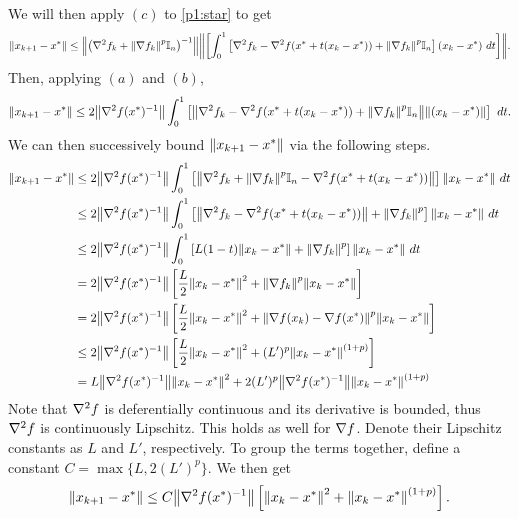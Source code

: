 \begin{solution}
    \newpage
    We will then apply $(c)$ to \ref{p1:star} to get 
    \[\norm{x_{k+1} - x^{*}} \leq \norm{\left ( \nabla^2f_k + \norm{\nabla f_k}^p \mathbb{I}_n\right)^{-1}}\norm{\left[ \int_0^1 \left[ \nabla^2 f_k - \nabla^2f(x^{*} + t(x_k - x^{*})) + \norm{\nabla f_k}^p\mathbb{I}_n\right](x_k - x^{*}) \ dt\right]}.\]
    Then, applying $(a)$ and $(b)$, 
    \[\norm{x_{k+1} - x^{*}} \leq 2\norm{\nabla^2f(x^{*})^{-1}} \int_0^1 \left[ \norm{\nabla^2 f_k - \nabla^2f(x^{*} + t(x_k - x^{*})) + \norm{\nabla f_k}^p\mathbb{I}_n}\norm{(x_k - x^{*})} \right] \ dt.\]
    We can then successively bound $\norm{x_{k+1} - x^{*}}$ via the following steps.
    \begin{align*}
        \norm{x_{k+1} - x\star} &\leq 2\norm{\grad^2f(x\star)\inv}\int_0^1 \left[ \norm{\grad^2f_k + \norm{\grad f_k}^p\id_n - \grad^2 f(x\star + t(x_k - x\star))}\right]\norm{x_k - x\star} \ dt \\
        &\leq 2\norm{\grad^2f(x\star)\inv}\int_0^1 \left[ \norm{\grad^2f_k - \grad^2 f(x\star + t(x_k - x\star))}  + \norm{\grad f_k}^p\right]\norm{x_k - x\star} \ dt \\
        &\leq 2\norm{\grad^2f(x\star)\inv}\int_0^1 \left[ L(1 - t)\norm{x_k - x\star}  + \norm{\grad f_k}^p\right]\norm{x_k - x\star} \ dt \\
        &= 2\norm{\grad^2f(x\star)\inv}\left[ \frac{L}{2}\norm{x_k - x\star}^2  + \norm{\grad f_k}^p\norm{x_k - x\star}\right] \\
        &= 2\norm{\grad^2f(x\star)\inv}\left[ \frac{L}{2}\norm{x_k - x\star}^2  + \norm{\grad f(x_k) - \grad f(x\star)}^p\norm{x_k - x\star}\right] \\
        &\leq 2\norm{\grad^2f(x\star)\inv}\left[ \frac{L}{2}\norm{x_k - x\star}^2  + (L')^p\norm{x_k - x\star}^{(1+p)}\right] \\
        &=  L\norm{\grad^2f(x\star)\inv}\norm{x_k - x\star}^2  + 2(L')^p\norm{\grad^2f(x\star)\inv}\norm{x_k - x\star}^{(1+p)}
    \end{align*}
    Note that $\nabla^2 f$ is deferentially continuous and its derivative is bounded, thus $\nabla^2 f$ is continuously Lipschitz. This holds as well for $\nabla f$. Denote their Lipschitz constants as $L$ and $L'$, respectively. To group the terms together, define a constant $C = \max \{ L, 2(L')^p\}$. We then get
    \[\norm{x_{k+1} - x^{*}} \leq C\norm{\nabla^2f(x^{*})^{-1}}\left[ \norm{x_k - x^{*}}^2 + \norm{x_k - x^{*}}^{(1 + p)}\right].\]
    

\end{solution}
